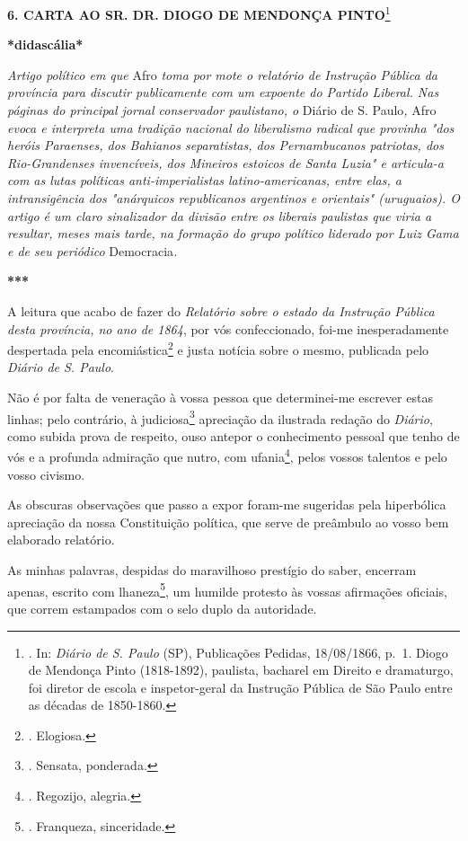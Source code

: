 \textbf{6. CARTA AO SR. DR. DIOGO DE MENDONÇA PINTO}\footnote{. In:
  \emph{Diário de S. Paulo} (SP), Publicações Pedidas, 18/08/1866, p.~1.
  Diogo de Mendonça Pinto (1818-1892), paulista, bacharel em Direito e
  dramaturgo, foi diretor de escola e inspetor-geral da Instrução
  Pública de São Paulo entre as décadas de 1850-1860.}

\textbf{*didascália*}

\emph{Artigo político em que} Afro \emph{toma por mote o relatório de
Instrução Pública da província para discutir publicamente com um
expoente do Partido Liberal. Nas páginas do principal jornal conservador
paulistano, o} Diário de S. Paulo\emph{,} Afro \emph{evoca e interpreta
uma tradição nacional do liberalismo radical que provinha "dos heróis
Paraenses, dos Bahianos separatistas, dos Pernambucanos patriotas, dos
Rio-Grandenses invencíveis, dos Mineiros estoicos de Santa Luzia" e
articula-a com as lutas políticas anti-imperialistas latino-americanas,
entre elas, a intransigência dos "anárquicos republicanos argentinos e
orientais" (uruguaios). O artigo é um claro sinalizador da divisão entre
os liberais paulistas que viria a resultar, meses mais tarde, na
formação do grupo político liderado por Luiz Gama e de seu periódico}
Democracia\emph{.}

\textbf{***}

A leitura que acabo de fazer do \emph{Relatório sobre o estado da
Instrução Pública desta província, no ano de 1864}, por vós
confeccionado, foi-me inesperadamente despertada pela
encomiástica\footnote{. Elogiosa.} e justa notícia sobre o mesmo,
publicada pelo \emph{Diário de S. Paulo}.

Não é por falta de veneração à vossa pessoa que determinei-me escrever
estas linhas; pelo contrário, à judiciosa\footnote{. Sensata, ponderada.}
apreciação da ilustrada redação do \emph{Diário}, como subida prova de
respeito, ouso antepor o conhecimento pessoal que tenho de vós e a
profunda admiração que nutro, com ufania\footnote{. Regozijo, alegria.},
pelos vossos talentos e pelo vosso civismo.

As obscuras observações que passo a expor foram-me sugeridas pela
hiperbólica apreciação da nossa Constituição política, que serve de
preâmbulo ao vosso bem elaborado relatório.

As minhas palavras, despidas do maravilhoso prestígio do saber, encerram
apenas, escrito com lhaneza\footnote{. Franqueza, sinceridade.}, um
humilde protesto às vossas afirmações oficiais, que correm estampados
com o selo duplo da autoridade.

